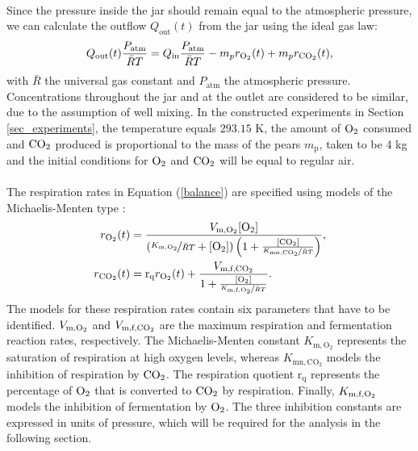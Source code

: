 \\
Since the pressure inside the jar should remain equal to the atmospheric pressure, we can calculate the outflow $Q_\text{out}(t)$ from the jar using the ideal gas law:
\begin{equation}
Q_{\text{out}}(t)\frac{P_\text{atm}}{\bar{R}T} = Q_{\text{in}}\frac{P_\text{atm}}{\bar{R}T} - m_p r_{\text{O}_2}(t) + m_p r_{\text{CO}_2}(t),
\label{balance}
\end{equation}
with $\bar{R}$ the universal gas constant and $P_\text{atm}$ the atmospheric pressure. Concentrations throughout the jar and at the outlet are considered to be similar, due to the assumption of well mixing. In the constructed experiments in Section \ref{sec_experiments}, the temperature equals $293.15$ K,  the amount of $\text{O}_2$ consumed and $\text{CO}_2$ produced is proportional to the mass of the pears $m_\text{p}$, taken to be 4 kg and the initial conditions for $\text{O}_2$ and $\text{CO}_2$ will be equal to regular air.
\\
\\
The respiration rates in Equation (\ref{balance}) are specified using models of the Michaelis-Menten type \parencite{hertog}:
{\color{red}\begin{equation}
\begin{aligned}
r_{\text{O}_2}(t) &= 
\frac{V_{\text{m},\text{O}_2}[\text{O}_2]}
{\left(\nicefrac{K_{\text{m},\text{O}_2}}{\bar{R}T} + [\text{O}_2]\right)
	\left(1 + \frac{[\text{CO}_2]}{\nicefrac{K_{\text{mn},\text{CO}_2}}{\bar{R}T}}\right)},\\
r_{\text{CO}_2}(t) &= 
\text{r}_\text{q}r_{\text{O}_2}(t) + 
\frac{V_{\text{m,f,}\text{CO}_2}}
{1 + \frac{[\text{O}_2]}{\nicefrac{K_{\text{m,f},\text{O}_2}}{\bar{R}T}}}.
\end{aligned}
\label{inhibitions}
\end{equation}}
The models for these respiration rates contain six parameters that have to be identified. $V_{\text{m},\text{O}_2}$ and $V_{\text{m,f,}\text{CO}_2}$ are the maximum respiration and fermentation reaction rates, respectively. The Michaelis-Menten constant $K_{\text{m},\text{O}_2}$ represents the saturation of respiration at high oxygen levels, whereas $K_{\text{mn},\text{CO}_2}$ models the inhibition of respiration by $\text{CO}_2$. The respiration quotient $\text{r}_\text{q}$ represents the percentage of $\text{O}_2$ that is converted to $\text{CO}_2$ by respiration. Finally, $K_{\text{m,f},\text{O}_2}$ models the inhibition of fermentation by $\text{O}_2$. {\color{red}The three inhibition constants are expressed in units of pressure, which will be required for the analysis in the following section.}
\\
